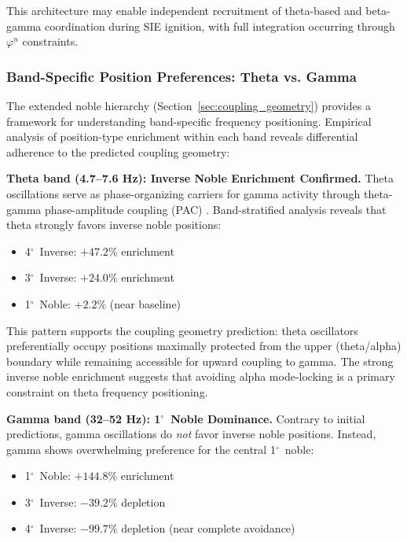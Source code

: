 \documentclass[11pt,a4paper]{article}
\newcommand{\degree}{$^\circ$}  %
\newcommand{\phisym}{\varphi}
\begin{document}
This architecture may enable independent recruitment of theta-based and beta-gamma coordination during SIE ignition, with full integration occurring through $\phisym^n$ constraints.

\subsubsection{Band-Specific Position Preferences: Theta vs. Gamma}
\label{sec:theta_gamma_inverse}

The extended noble hierarchy (Section~\ref{sec:coupling_geometry}) provides a framework for understanding band-specific frequency positioning. Empirical analysis of position-type enrichment within each band reveals differential adherence to the predicted coupling geometry:

\textbf{Theta band (4.7--7.6 Hz): Inverse Noble Enrichment Confirmed.}
Theta oscillations serve as phase-organizing carriers for gamma activity through theta-gamma phase-amplitude coupling (PAC) \parencite{lisman2013thetagamma}. Band-stratified analysis reveals that theta strongly favors inverse noble positions:
\begin{itemize}
    \item 4\degree\ Inverse: $+47.2\%$ enrichment
    \item 3\degree\ Inverse: $+24.0\%$ enrichment
    \item 1\degree\ Noble: $+2.2\%$ (near baseline)
\end{itemize}

This pattern supports the coupling geometry prediction: theta oscillators preferentially occupy positions maximally protected from the upper (theta/alpha) boundary while remaining accessible for upward coupling to gamma. The strong inverse noble enrichment suggests that avoiding alpha mode-locking is a primary constraint on theta frequency positioning.

\textbf{Gamma band (32--52 Hz): 1\degree\ Noble Dominance.}
Contrary to initial predictions, gamma oscillations do \textit{not} favor inverse noble positions. Instead, gamma shows overwhelming preference for the central 1\degree\ noble:
\begin{itemize}
    \item 1\degree\ Noble: $+144.8\%$ enrichment
    \item 3\degree\ Inverse: $-39.2\%$ depletion
    \item 4\degree\ Inverse: $-99.7\%$ depletion (near complete avoidance)
\end{itemize}
\end{document}
